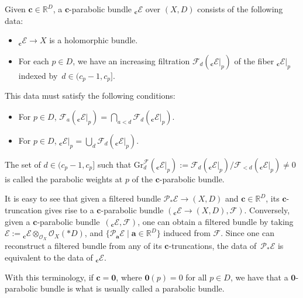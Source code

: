 \begin{Definition} Given $\boldsymbol{c}\in \mathbb{R}^{D}$, a $\boldsymbol{c}$-parabolic bundle $_{\boldsymbol{c}}\mathcal{E}$ over $(X,D)$ consists of the following data:
\begin{itemize}\itemsep=0pt
 \item $_{\boldsymbol{c}}\mathcal{E} \to X$ is a holomorphic bundle.
 \item For each $p\in D$, we have an increasing filtration $\mathcal{F}_d(_{\boldsymbol{c}}\mathcal{E}|_p)$ of the fiber $_{\boldsymbol{c}}\mathcal{E}|_p$ indexed by~${d\in (c_p-1,c_p]}$.
\end{itemize}
This data must satisfy the following conditions:
\begin{itemize}\itemsep=0pt
 \item For $p\in D$, $\mathcal{F}_a(_{\boldsymbol{c}}\mathcal{E}|_p)=\bigcap_{a<d}\mathcal{F}_d(_{\boldsymbol{c}}\mathcal{E}|_p)$.
 \item For $p\in D$, $_{\boldsymbol{c}}\mathcal{E}|_p=\bigcup_{d}\mathcal{F}_d(_{\boldsymbol{c}}\mathcal{E}|_p)$.
\end{itemize}
The set of $d\in (c_p-1,c_p]$ such that $\text{Gr}^{\mathcal{F}}_{d}(_{\boldsymbol{c}}\mathcal{E}|_p):=\mathcal{F}_d(_{\boldsymbol{c}}\mathcal{E}|_p)/\mathcal{F}_{<d}(_{\boldsymbol{c}}\mathcal{E}|_p)\neq 0$ is called the parabolic weights at $p$ of the $\boldsymbol{c}$-parabolic bundle.
\end{Definition}
It is easy to see that given a filtered bundle $\mathcal{P}_*\mathcal{E}\to (X,D)$ and $\boldsymbol{c}\in \mathbb{R}^{D}$, its $\boldsymbol{c}$-truncation gives rise to a $\boldsymbol{c}$-parabolic bundle $(_{\boldsymbol{c}}\mathcal{E}\to (X,D),\mathcal{F})$. Conversely, given a $\boldsymbol{c}$-parabolic bundle~$(_{\boldsymbol{c}}\mathcal{E},\mathcal{F})$, one can obtain a filtered bundle by taking $\mathcal{E}:= {}_{\boldsymbol{c}}\mathcal{E}\otimes_{\mathcal{O}_X} \mathcal{O}_X(*D)$, and $\bigl\{\mathcal{P}_{\boldsymbol{a}}\mathcal{E} \mid \boldsymbol{a}\in \mathbb{R}^{D} \bigr\}$ induced from $\mathcal{F}$. Since one can reconstruct a filtered bundle from any of its $\boldsymbol{c}$-truncations, the data of~$\mathcal{P}_*\mathcal{E}$ is equivalent to the data of $_{\boldsymbol{c}}\mathcal{E}$.

With this terminology, if $\boldsymbol{c}=\boldsymbol{0}$, where $\boldsymbol{0}(p)=0$ for all $p\in D$, we have that a $\boldsymbol{0}$-parabolic bundle is what is usually called a parabolic bundle.


